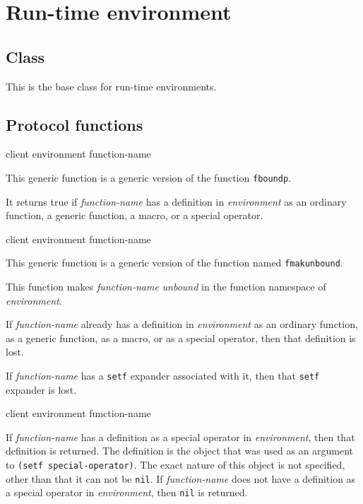 \chapter{Run-time environment}

\section{Class}


This is the base class for run-time environments.

\section{Protocol functions}
\label{sec-run-time-protocol-functions}

 {client environment function-name}

This generic function is a generic version of the \commonlisp{}
function \texttt{fboundp}.

It returns true if \textit{function-name} has a definition in
\textit{environment} as an ordinary function, a generic function, a
macro, or a special operator.

 {client environment function-name}

This generic function is a generic version of the \commonlisp{}
function named \texttt{fmakunbound}.

This function makes \textit{function-name} \emph{unbound} in the
function namespace of \textit{environment}.

If \textit{function-name} already has a definition in
\textit{environment} as an ordinary function, as a generic function,
as a macro, or as a special operator, then that definition is lost.

If \textit{function-name} has a \texttt{setf} expander associated with
it, then that \texttt{setf} expander is lost.

 {client environment function-name}

If \textit{function-name} has a definition as a special operator in
\textit{environment}, then that definition is returned.  The
definition is the object that was used as an argument to \texttt{(setf
  special-operator)}.  The exact nature of this object is not
specified, other than that it can not be \texttt{nil}.  If
\textit{function-name} does not have a definition as a special
operator in \textit{environment}, then \texttt{nil} is returned.

